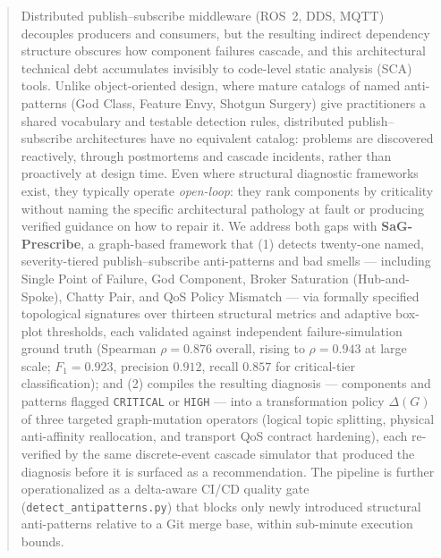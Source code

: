 \documentclass[11pt]{article}
\begin{document}
\begin{abstract}
Distributed publish--subscribe middleware (ROS~2, DDS, MQTT) decouples producers and consumers, but
the resulting indirect dependency structure obscures how component failures cascade, and this
architectural technical debt accumulates invisibly to code-level static analysis (SCA) tools. Unlike
object-oriented design, where mature catalogs of named anti-patterns (God Class, Feature Envy,
Shotgun Surgery) give practitioners a shared vocabulary and testable detection rules, distributed
publish--subscribe architectures have no equivalent catalog: problems are discovered reactively,
through postmortems and cascade incidents, rather than proactively at design time. Even where
structural diagnostic frameworks exist, they typically operate \emph{open-loop}: they rank components
by criticality without naming the specific architectural pathology at fault or producing verified
guidance on how to repair it. We address both gaps with \textbf{SaG-Prescribe}, a graph-based
framework that (1) detects twenty-one named, severity-tiered publish--subscribe anti-patterns and bad
smells --- including Single Point of Failure, God Component, Broker Saturation (Hub-and-Spoke), Chatty
Pair, and QoS Policy Mismatch --- via formally specified topological signatures over thirteen
structural metrics and adaptive box-plot thresholds, each validated against independent
failure-simulation ground truth (Spearman $\rho = 0.876$ overall, rising to $\rho = 0.943$ at large
scale; $F_1 = 0.923$, precision $0.912$, recall $0.857$ for critical-tier classification); and (2)
compiles the resulting diagnosis --- components and patterns flagged \texttt{CRITICAL} or
\texttt{HIGH} --- into a transformation policy $\Delta(G)$ of three targeted graph-mutation operators
(logical topic splitting, physical anti-affinity reallocation, and transport QoS contract hardening),
each re-verified by the same discrete-event cascade simulator that produced the diagnosis before it
is surfaced as a recommendation. The pipeline is further operationalized as a delta-aware CI/CD
quality gate (\texttt{detect\_antipatterns.py}) that blocks only newly introduced structural
anti-patterns relative to a Git merge base, within sub-minute execution bounds.


\end{abstract}
\end{document}
